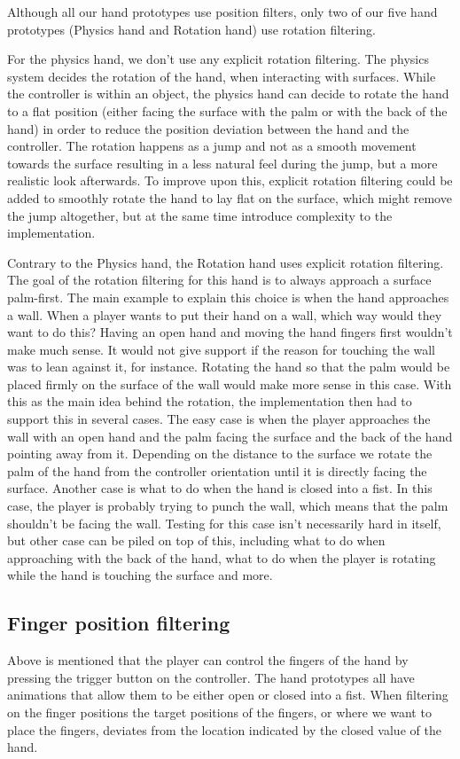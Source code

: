 Although all our hand prototypes use position filters, only two of our five hand prototypes (Physics hand and Rotation hand) use rotation filtering.

For the physics hand, we don't use any explicit rotation filtering. The physics system decides the rotation of the hand, when interacting with surfaces. While the controller is within an object, the physics hand can decide to rotate the hand to a flat position (either facing the surface with the palm or with the back of the hand) in order to reduce the position deviation between the hand and the controller. The rotation happens as a jump and not as a smooth movement towards the surface resulting in a less natural feel during the jump, but a more realistic look afterwards. To improve upon this, explicit rotation filtering could be added to smoothly rotate the hand to lay flat on the surface, which might remove the jump altogether, but at the same time introduce complexity to the implementation.

Contrary to the Physics hand, the Rotation hand uses explicit rotation filtering. The goal of the rotation filtering for this hand is to always approach a surface palm-first. The main example to explain this choice is when the hand approaches a wall. When a player wants to put their hand on a wall, which way would they want to do this? Having an open hand and moving the hand fingers first wouldn't make much sense. It would not give support if the reason for touching the wall was to lean against it, for instance. Rotating the hand so that the palm would be placed firmly on the surface of the wall would make more sense in this case. With this as the main idea behind the rotation, the implementation then had to support this in several cases. The easy case is when the player approaches the wall with an open hand and the palm facing the surface and the back of the hand pointing away from it. Depending on the distance to the surface we rotate the palm of the hand from the controller orientation until it is directly facing the surface. Another case is what to do when the hand is closed into a fist. In this case, the player is probably trying to punch the wall, which means that the palm shouldn't be facing the wall. Testing for this case isn't necessarily hard in itself, but other case can be piled on top of this, including what to do when approaching with the back of the hand, what to do when the player is rotating while the hand is touching the surface and more.

\subsection{Finger position filtering}
\label{subsec:categoryFingerFiltering}
Above is mentioned that the player can control the fingers of the hand by pressing the trigger button on the controller. The hand prototypes all have animations that allow them to be either open or closed into a fist. When filtering on the finger positions the target positions of the fingers, or where we want to place the fingers, deviates from the location indicated by the closed value of the hand.

